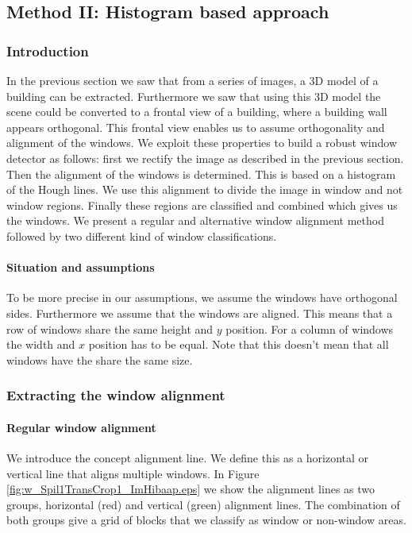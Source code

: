 \subsection{Method II: Histogram based approach} 
\label{sec:method2}
\subsubsection{Introduction}
In the previous section we saw that from a series of images, a 3D model of a
building can be extracted. Furthermore we saw that using this 3D model the
scene could be converted to a frontal view of a building, where a building wall
appears orthogonal.  This frontal view enables us to assume orthogonality and
alignment of the windows.  We exploit these properties to build a robust window
detector as follows: first we rectify the image as described in the previous section.  Then the alignment of the windows
is determined. This is based on a histogram of the Hough lines. We use this
alignment to divide the image in window and not window regions.  Finally these
regions are classified and combined which gives us the windows.
We present a regular and alternative window alignment method
followed by two different kind of window classifications. 


\paragraph{Situation and assumptions}
To be more precise in our assumptions, we assume the windows have orthogonal
sides.  Furthermore we assume that the windows are aligned. This means that a
row of windows share the same height and $y$ position. For a column of windows
the width and $x$ position has to be equal.  Note that this doesn't mean that
all windows have the share the same size.



\subsubsection{Extracting the window alignment}
\paragraph{Regular window alignment}
We introduce the concept alignment line. We define this as a horizontal or
vertical line that aligns multiple windows. In Figure
\ref{fig:w_Spil1TransCrop1_ImHibaap.eps}
we show the alignment lines as two groups, horizontal (red) and
vertical (green) alignment lines.  The combination of both groups give a grid of
blocks that we classify as window or non-window areas.\\

